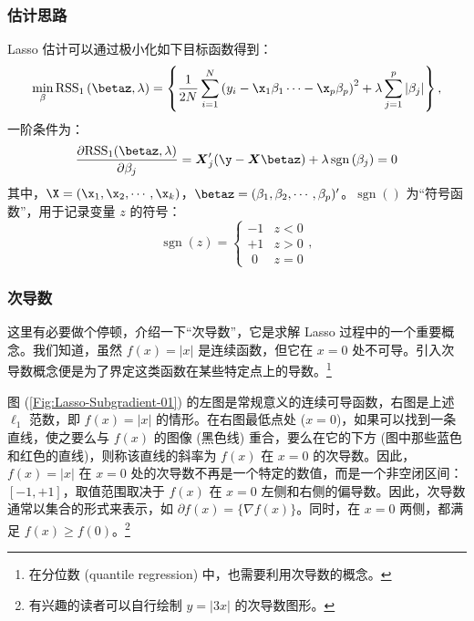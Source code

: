 \subsubsection{估计思路}
Lasso 估计可以通过极小化如下目标函数得到：
\begin{equation}\label{eq:lasso-HTW2015-2-5-B}
\underset{\beta}{\operatorname{min}}
\, \mathrm{RSS}_1\left(\betaz,\lambda\right) = 
\left\{\frac{1}{2 N}
\sum_{i=1}^{N}\left(y_i - \x_1\beta_1 \cdots - \x_p\beta_p \right)^2
   + \lambda \sum_{j=1}^{p}\left|\beta_{j}\right|\right\},
\end{equation}
一阶条件为：
\begin{equation}\label{eq:Lasso-foc-01}
\frac{\partial{\mathrm{RSS}_1(\betaz,\lambda)}}{\partial{\beta_j}} = 
\boldsymbol{X}_{j}^{\prime}(\y-\boldsymbol{X} \betaz)+\lambda \operatorname{sgn}\left(\beta_{j}\right)=0	
\end{equation}
其中，$\X = (\x_1,\x_2,\cdots,\x_k)$，$\betaz=(\beta_1,\beta_2,\cdots,\beta_p)'$。$\operatorname{sgn}()$ 为“符号函数”，用于记录变量 $z$ 的符号：
$$
    \operatorname{sgn}(z) =
    \begin{cases}
      -1 & z < 0\\
      +1 & z > 0\\
      \,\,0 & z = 0
    \end{cases},
$$

\subsubsection{次导数}
这里有必要做个停顿，介绍一下“次导数”，它是求解 Lasso 过程中的一个重要概念。我们知道，虽然 $f(x)=|x|$ 是连续函数，但它在 $x=0$ 处不可导。引入次导数概念便是为了界定这类函数在某些特定点上的导数。\footnote{%
      在分位数 (quantile regression) 中，也需要利用次导数的概念。} 

图 (\ref{Fig:Lasso-Subgradient-01}) 的左图是常规意义的连续可导函数，右图是上述 $\ell_{1}$ 范数，即 $f(x)=|x|$ 的情形。在右图最低点处 ($x=0$)，如果可以找到一条直线，使之要么与 $f(x)$ 的图像 (黑色线) 重合，要么在它的下方 (图中那些蓝色和红色的直线)，则称该直线的斜率为 $f(x)$ 在 $x=0$ 的次导数。因此，$f(x)=|x|$ 在 $x=0$ 处的次导数不再是一个特定的数值，而是一个非空闭区间：$[-1,+1]$，取值范围取决于 $f(x)$ 在 $x=0$ 左侧和右侧的偏导数。因此，次导数通常以集合的形式来表示，如  $\partial f(x) = \{\nabla f(x)\}$。同时，在 $x=0$ 两侧，都满足 $f(x) \geq f(0)$。\footnote{%
      有兴趣的读者可以自行绘制 $y=|3x|$ 的次导数图形。}

